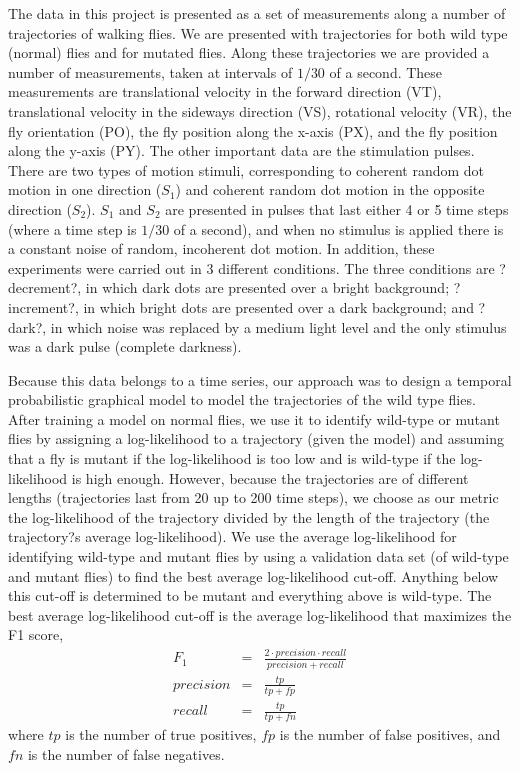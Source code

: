 \documentclass{article} %
\begin{document}
The data in this project is presented as a set of measurements along a number of trajectories of walking flies. We are presented with trajectories for both wild type (normal) flies and for mutated flies. Along these trajectories we are provided a number of measurements, taken at intervals of $1/30$ of a second. These measurements are translational velocity in the forward direction (VT), translational velocity in the sideways direction (VS), rotational velocity (VR), the fly orientation (PO), the fly position along the x-axis (PX), and the fly position along the y-axis (PY). The other important data are the stimulation pulses. There are two types of motion stimuli, corresponding to coherent random dot motion in one direction ($S_1$) and coherent random dot motion in the opposite direction ($S_2$). $S_1$ and $S_2$ are presented in pulses that last either 4 or 5 time steps (where a time step is $1/30$ of a second), and when no stimulus is applied there is a constant noise of random, incoherent dot motion. In addition, these experiments were carried out in 3 different conditions. The three conditions are ?decrement?, in which dark dots are presented over a bright background; ?increment?, in which bright dots are presented over a dark background; and ?dark?, in which noise was replaced by a medium light level and the only stimulus was a dark pulse (complete darkness).

Because this data belongs to a time series, our approach was to design a temporal probabilistic graphical model to model the trajectories of the wild type flies. After training a model on normal flies, we use it to identify wild-type or mutant flies by assigning a log-likelihood to a trajectory (given the model) and assuming that a fly is mutant if the log-likelihood is too low and is wild-type if the log-likelihood is high enough. However, because the trajectories are of different lengths (trajectories last from 20 up to 200 time steps), we choose as our metric the log-likelihood of the trajectory divided by the length of the trajectory (the trajectory?s average log-likelihood). We use the average log-likelihood for identifying wild-type and mutant flies by using a validation data set (of wild-type and mutant flies) to find the best average log-likelihood cut-off. Anything below this cut-off is determined to be mutant and everything above is wild-type. The best average log-likelihood cut-off is the average log-likelihood that maximizes the F1 score,
\begin{eqnarray*}
F_1 &=& \frac{2\cdot precision \cdot recall}{precision + recall}\\
precision &=& \frac{tp}{tp + fp}\\
recall &=& \frac{tp}{tp + fn}
\end{eqnarray*}
where $tp$ is the number of true positives, $fp$ is the number of false positives, and $fn$ is the number of false negatives.
\end{document}

